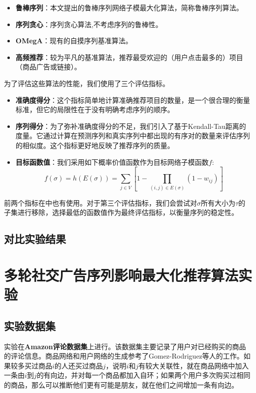 \begin{itemize}
\item {\bfseries 鲁棒序列}：本文提出的鲁棒序列网络子模最大化算法，简称鲁棒序列算法。
\item {\bfseries 序列贪心}：序列贪心算法\cite{mitrovic2018submodularity},不考虑序列的鲁棒性。
\item {\bfseries OMegA}：现有的自摸序列基准算法\cite{tschiatschek2017selecting}。
\item {\bfseries 高频推荐}：较为平凡的基准算法，推荐最受欢迎的（用户点击最多的）项目（商品广告或链接）。
\end{itemize}

为了评估这些算法的性能，我们使用了三个评估指标。

\begin{itemize}
    \item \textbf{准确度得分}：这个指标简单地计算准确推荐项目的数量，是一个很合理的衡量标准，但它的局限性在于没有明确考虑序列的顺序。
    \item \textbf{序列得分}：为了弥补准确度得分的不足，我们引入了基于Kendall-Tau距离\cite{kendall1938new}的度量。它通过计算在预测序列和真实序列中都出现的有序对的数量来评估序列的相似度。这个指标更好地反映了推荐序列的质量。
    \item \textbf{目标函数值}：我们采用如下概率价值函数作为目标网络子模函数$f$:
\begin{equation}
    f(\sigma)=h(E(\sigma))=\sum_{j\in V} [1- \prod_{(i,j)\in E(\sigma)} (1-w_{ij})]
\end{equation}
\end{itemize}

前两个指标在\parencite{mitrovic2019adaptive}中也有使用。对于第三个评估指标，我们会尝试对$\sigma$所有大小为$\tau$的子集进行移除，选择最低的函数值作为最终评估指标，以衡量序列的稳定性。


\subsection{对比实验结果}


\section{多轮社交广告序列影响最大化推荐算法实验}

\subsection{实验数据集}

实验在{\bfseries Amazon评论数据集}\cite{amazon24}上进行。该数据集主要记录了用户对已经购买的商品的评论信息。商品网络和用户网络的生成参考了Gomez-Rodriguez等人\cite{netgen}的工作。如果较多买过商品$i$的人还买过商品$j$，说明$i$和$j$有较大关联性，就在商品网络中加入一条由$i$到$j$的有向边，并对每一个商品都加入自环；如果两个用户多次购买过相同的商品，那么可以推断他们更有可能是朋友，就在他们之间增加一条有向边。

